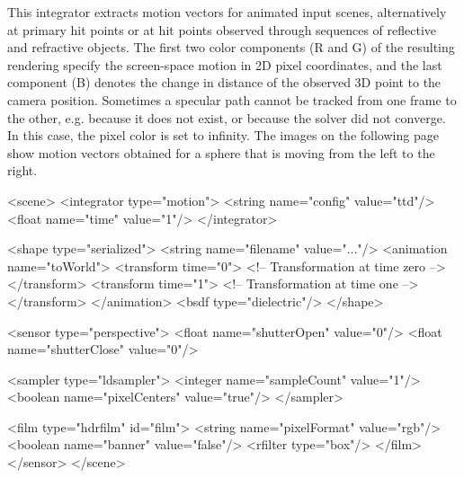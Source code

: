 This integrator extracts motion vectors for animated input scenes, alternatively
at primary hit points or at hit points observed through sequences of reflective
and refractive objects. The first two color components (R and G) of the resulting
rendering specify the screen-space motion in 2D pixel coordinates, and the last
component (B) denotes the change in distance of the observed 3D point to the
camera position. Sometimes a specular path cannot be tracked from one frame to the other,
e.g. because it does not exist, or because the solver did not converge. In this case,
the pixel color is set to infinity. The images on the following page show
motion vectors obtained for a sphere that is moving from the left to the right.

\clearpage

\begin{xml}[caption={Exemplary scene configuration for computing specular motion vectors}]
<scene>
    <integrator type="motion">
        <string name="config" value="ttd"/>
        <float name="time" value="1"/>
    </integrator>

    <shape type="serialized">
        <string name="filename" value="..."/>
        <animation name="toWorld">
            <transform time="0">
                <!-- Transformation at time zero -->
            </transform>
            <transform time="1">
                <!-- Transformation at time one -->
            </transform>
        </animation>
         <bsdf type="dielectric"/>
    </shape>

    <sensor type="perspective">
        <float name="shutterOpen" value="0"/>
        <float name="shutterClose" value="0"/>

        <sampler type="ldsampler">
            <integer name="sampleCount" value="1"/>
            <boolean name="pixelCenters" value="true"/>
        </sampler>

        <film type="hdrfilm" id="film">
            <string name="pixelFormat" value="rgb"/>
            <boolean name="banner" value="false"/>
            <rfilter type="box"/>
        </film>
    </sensor>
</scene>
\end{xml}



